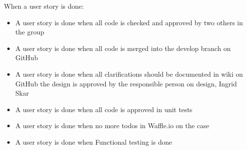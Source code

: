 \begin{description}
    \item[When a user story is done:]
\end{description}
\begin{itemize}[noitemsep]
    \item A user story is done when all code is checked and approved by two others in the group
    \item A user story is done when all code is merged into the develop branch on GitHub
    \item A user story is done when all clarifications should be documented in wiki on GitHub
the design is approved by the responsible person on design, Ingrid Skar
    \item A user story is done when all code is approved in unit tests
    \item A user story is done when no more todos in Waffle.io on the case
    \item A user story is done when Functional testing is done
\end{itemize}

